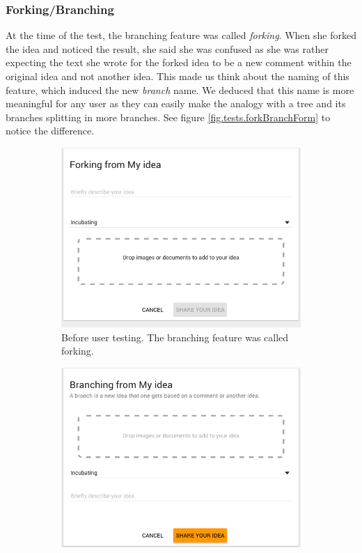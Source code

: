 \documentclass[a4paper,12pt, oneside]{article}
\begin{document}
\subsubsection*{Forking/Branching}
At the time of the test, the branching feature was called \emph{forking}.
When she forked the idea and noticed the result, she said she was confused as she was rather expecting the text she wrote for the forked idea to be a new comment within the original idea and not another idea.
This made us think about the naming of this feature, which induced the new \emph{branch} name.
We deduced that this name is more meaningful for any user as they can easily make the analogy with a tree and its branches splitting in more branches.
See figure \ref{fig.tests.forkBranchForm} to notice the difference.

\begin{figure}[!htb]
    \begin{subfigure}[t]{.495\textwidth}
        \includegraphics[width=\textwidth]{images/user_tests/forkBranchForm_before.png}
        \caption{Before user testing. The branching feature was called forking.}
        \label{fig.tests.forkBranchForm.before}
    \end{subfigure}
    \hfill
    \begin{subfigure}[t]{.495\textwidth}
        \includegraphics[width=\textwidth]{images/user_tests/forkBranchForm_after.png}

\end{subfigure}
\end{figure}
\end{document}
